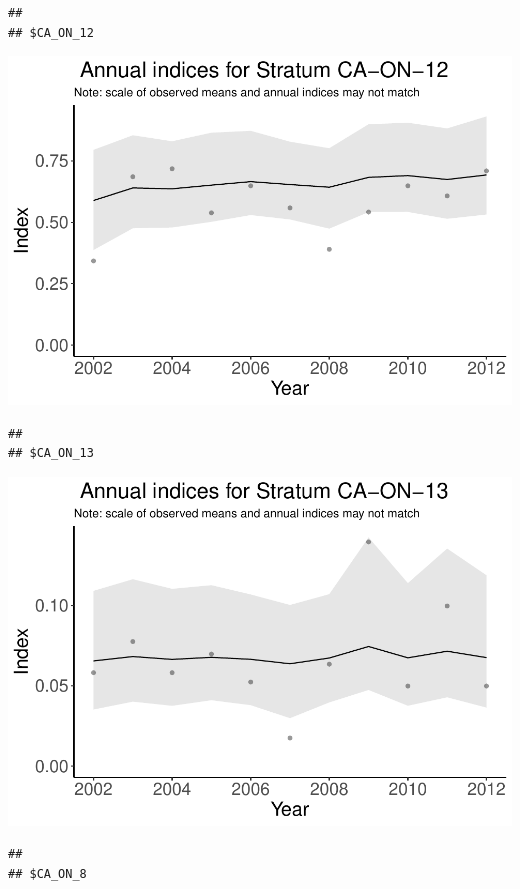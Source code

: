 \documentclass[]{article}
\begin{document}
\begin{verbatim}
## 
## $CA_ON_12
\end{verbatim}

\includegraphics{index_files/figure-latex/unnamed-chunk-7-8.pdf}

\begin{verbatim}
## 
## $CA_ON_13
\end{verbatim}

\includegraphics{index_files/figure-latex/unnamed-chunk-7-9.pdf}

\begin{verbatim}
## 
## $CA_ON_8
\end{verbatim}
\end{document}
